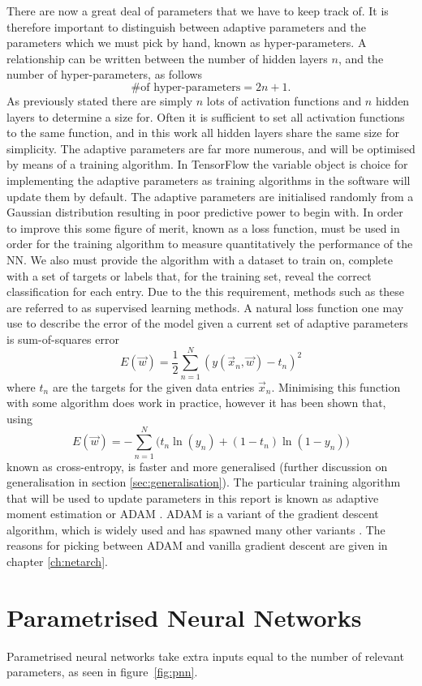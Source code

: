 
There are now a great deal of parameters that we have to keep track of. It
is therefore important to distinguish between adaptive parameters and the
parameters which we must pick by hand, known as hyper-parameters. A relationship
can be written between the number of hidden layers $n$, and the number of
hyper-parameters, as follows
\begin{equation}
\text{\# of hyper-parameters} = 2n + 1.
\label{eq:hyper}
\end{equation}
As previously stated there are simply $n$ lots of activation functions and $n$
hidden layers to determine a size for. Often it is sufficient to set all
activation functions to the same function, and in this work all hidden layers
share the same size for simplicity. The adaptive parameters are far more
numerous, and will be optimised by means of a training algorithm. In TensorFlow
the variable object is choice for implementing the adaptive parameters as
training algorithms in the software will update them by default. The adaptive
parameters are initialised randomly from a Gaussian distribution resulting in
poor predictive power to begin with. In order to improve this some figure of
merit, known as a loss function, must be used in order for the training
algorithm to measure quantitatively the performance of the NN. We also must
provide the algorithm with a dataset to train on, complete with a set of targets
or labels that, for the training set, reveal the correct classification for each
entry. Due to the this requirement, methods such as these are referred to as
supervised learning methods. A natural loss function one may use to describe the
error of the model given a current set of adaptive parameters is sum-of-squares
error
\begin{equation}
E(\vec{w}) = \frac{1}{2}\sum_{n=1}^{N}(y(\vec{x}_n, \vec{w}) - t_n)^2
\label{eq:sumofsquares}
\end{equation}
where $t_n$ are the targets for the given data entries $\vec{x}_n$.
Minimising this function with some algorithm does work in practice, however it
has been shown that, using
\begin{equation}
E(\vec{w}) = - \sum_{n=1}^{N} \Bigg (t_n \ln (y_n) + (1-t_n) \ln (1-y_n) \Bigg)
\label{eq:xentropy}
\end{equation}
known as cross-entropy, is faster and more generalised \cite{XEntropySimard}
(further discussion on generalisation in section \ref{sec:generalisation}). The
particular training algorithm that will be used to update parameters in this
report is known as adaptive moment estimation or ADAM \cite{ADAMOpt}. ADAM is a
variant of the gradient descent algorithm, which is widely used and has spawned
many other variants \cite{GDOverview}. The reasons for picking between ADAM and
vanilla gradient descent are given in chapter \ref{ch:netarch}.


\section{Parametrised Neural Networks}%
\label{sec:param-neural-nets}
Parametrised neural networks take extra inputs equal to the number of relevant
parameters, as seen in figure~\ref{fig:pnn}.



